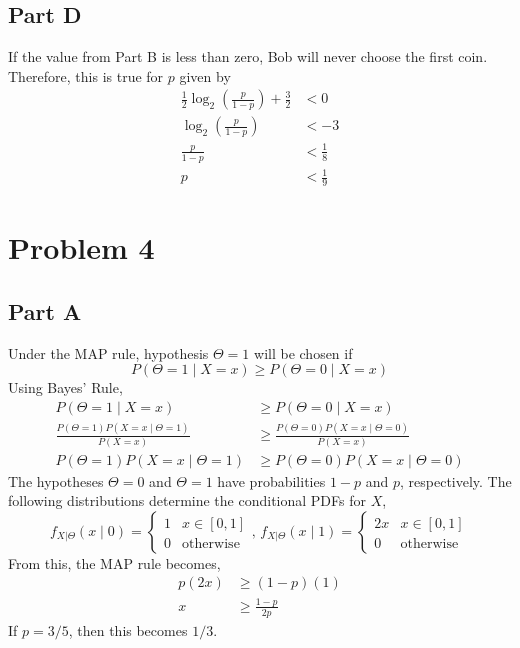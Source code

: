 \documentclass{article}
\begin{document}
\subsection*{Part D}

If the value from Part B is less than zero, Bob will never choose the first
coin. Therefore, this is true for $p$ given by
\begin{align*}
  \frac{1}{2} \log_2\left(\frac{p}{1 - p}\right) + \frac{3}{2} &< 0 \\
  \log_2\left(\frac{p}{1 - p}\right) &< -3 \\
  \frac{p}{1 - p} &< \frac{1}{8} \\
  p &< \frac{1}{9}
\end{align*}

\section*{Problem 4}

\subsection*{Part A}

Under the MAP rule, hypothesis $\Theta = 1$ will be chosen if
$$ P(\Theta = 1 \mid X = x) \geq P(\Theta = 0 \mid X = x) $$
Using Bayes' Rule,
\begin{align*}
  P(\Theta = 1 \mid X = x) &\geq P(\Theta = 0 \mid X = x) \\
  \frac{P(\Theta = 1) P(X = x \mid \Theta = 1)}{P(X = x)} &\geq
  \frac{P(\Theta = 0) P(X = x \mid \Theta = 0)}{P(X = x)} \\
  P(\Theta = 1) P(X = x \mid \Theta = 1) &\geq P(\Theta = 0) P(X = x \mid
  \Theta = 0)
\end{align*}
The hypotheses $\Theta = 0$ and $\Theta = 1$ have probabilities $1 - p$ and
$p$, respectively. The following distributions determine the conditional PDFs
for $X$,
$$ f_{X|\Theta}(x \mid 0) = \begin{cases}
  1 & x \in [0, 1] \\
  0 & \mathrm{otherwise}
\end{cases},\, f_{X|\Theta}(x \mid 1) = \begin{cases}
  2x & x \in [0, 1] \\
  0 & \mathrm{otherwise}
\end{cases} $$
From this, the MAP rule becomes,
\begin{align*}
  p (2x) &\geq (1 - p) (1) \\
  x &\geq \frac{1 - p}{2p}
\end{align*}
If $p = 3/5$, then this becomes $1/3$.
\end{document}
